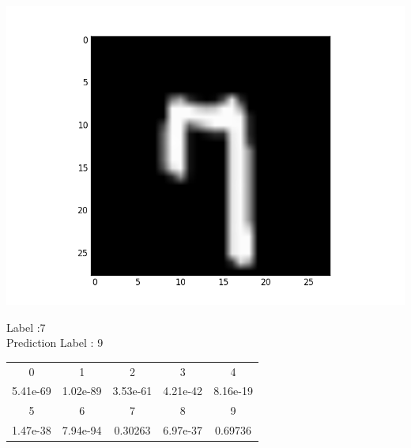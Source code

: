 \documentclass{article}
\begin{document}
\noindent\begin{minipage}{0.5\textwidth}
	\includegraphics[width=\linewidth]{hw3_f1}
\end{minipage}%
\hfill%
\begin{minipage}{0.5\textwidth}
	Label :7\\
	Prediction Label : 9\\
	\begin{tabular}{ | c | c | c | c | c | }
		\hline
		0 & 1 & 2 & 3 & 4 \\		
5.41e-69 &
1.02e-89 &
3.53e-61 &
4.21e-42 &
8.16e-19 \\
		\hline
		5 & 6 & 7 & 8 & 9 \\
1.47e-38 &
7.94e-94 &
0.30263 &
6.97e-37 &
0.69736 \\
		\hline
	\end{tabular}\\
\end{minipage}
\end{document}
